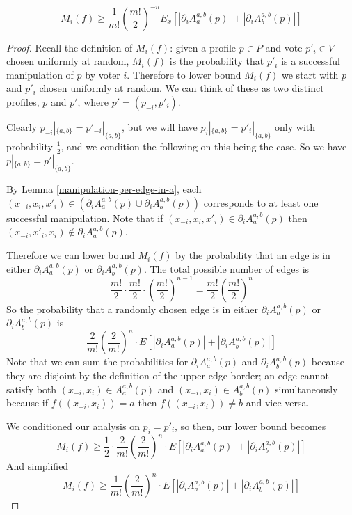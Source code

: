 	\begin{lemma}
		\label{friedgut-lemma-7}
		\[
			M_i(f) \ge \frac{1}{m!} \left(\frac{m!}{2}\right)^{-n} E_x \left[|\partial_i A^{a,b}_a(p)| + |\partial_i A^{a,b}_b(p)| \right]
		\]
	\end{lemma}

	\begin{proof}
		Recall the definition of $M_i(f)$: given a profile $p \in P$ and vote $p'_i \in V$ chosen uniformly at random, $M_i(f)$ is the probability that $p'_i$ is a successful manipulation of $p$ by voter $i$. Therefore to lower bound $M_i(f)$ we start with $p$ and $p'_i$ chosen uniformly at random. We can think of these as two distinct profiles, $p$ and $p'$, where $p' = (p_{-i}, p'_i)$.

		Clearly $p_{-i}|_{\{a,b\}} = p'_{-i}|_{\{a,b\}}$, but we will have $p_i|_{\{a,b\}} = p'_i|_{\{a,b\}}$ only with probability $\frac{1}{2}$, and we condition the following on this being the case. So we have $p|_{\{a,b\}} = p'|_{\{a,b\}}$.

		By Lemma \ref{manipulation-per-edge-in-a}, each $(x_{-i}, x_i, x'_i) \in (\partial_i A^{a,b}_a(p) \cup \partial_i A^{a,b}_b(p))$ corresponds to at least one successful manipulation. Note that if $(x_{-i}, x_i, x'_i) \in \partial_i A^{a,b}_a(p)$ then $(x_{-i}, x'_i, x_i) \notin \partial_i A^{a,b}_a(p)$.

		Therefore we can lower bound $M_i(f)$ by the probability that an edge is in either $\partial_i A^{a,b}_a(p)$ or $\partial_i A^{a,b}_b(p)$. The total possible number of edges is
		\[
			\frac{m!}{2} \cdot \frac{m!}{2} \cdot \left(\frac{m!}{2}\right)^{n-1} = \frac{m!}{2}\left(\frac{m!}{2}\right)^{n}
		\]
		So the probability that a randomly chosen edge is in either $\partial_i A^{a,b}_a(p)$ or $\partial_i A^{a,b}_b(p)$ is
		\[
			\frac{2}{m!} \left(\frac{2}{m!}\right)^{n} \cdot E \left[ |\partial_i A^{a,b}_a(p)| + |\partial_i A^{a,b}_b(p)| \right]
		\]
		Note that we can sum the probabilities for $\partial_i A^{a,b}_a(p)$ and $\partial_i A^{a,b}_b(p)$ because they are disjoint by the definition of the upper edge border; an edge cannot satisfy both $(x_{-i}, x_i) \in A^{a,b}_a(p)$ and $(x_{-i}, x_i) \in A^{a,b}_b(p)$ simultaneously because if $f((x_{-i}, x_i)) = a$ then $f((x_{-i}, x_i)) \ne b$ and vice versa.

		We conditioned our analysis on $p_i = p'_i$, so then, our lower bound becomes
		\[
			M_i(f) \ge \frac{1}{2} \cdot \frac{2}{m!}\left(\frac{2}{m!}\right)^{n} \cdot E \left[ |\partial_i A^{a,b}_a(p)| + |\partial_i A^{a,b}_b(p)| \right]
		\]
		And simplified
		\[
			M_i(f) \ge \frac{1}{m!}\left(\frac{2}{m!}\right)^{n} \cdot E \left[ |\partial_i A^{a,b}_a(p)| + |\partial_i A^{a,b}_b(p)| \right]
		\]
	\end{proof}


